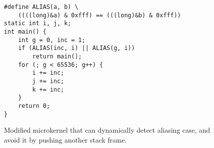 \documentclass[10pt, conference, compsocconf]{IEEEtran}
\begin{document}


\begin{figure}
  \begin{lstlisting}[frame=single, xleftmargin=.005\textwidth, xrightmargin=.005\textwidth]
#define ALIAS(a, b) \
    ((((long)&a) & 0xfff) == (((long)&b) & 0xfff))
static int i, j, k;
int main() {
    int g = 0, inc = 1;
    if (ALIAS(inc, i) || ALIAS(g, i))
        return main();
    for (; g < 65536; g++) {
        i += inc;
        j += inc;
        k += inc;
    }
    return 0;
}
  \end{lstlisting}
  \caption{Modified microkernel that can dynamically detect aliasing case, and avoid it by pushing another stack frame.}
  \label{lst:loopfixed}
\end{figure}
\end{document}
